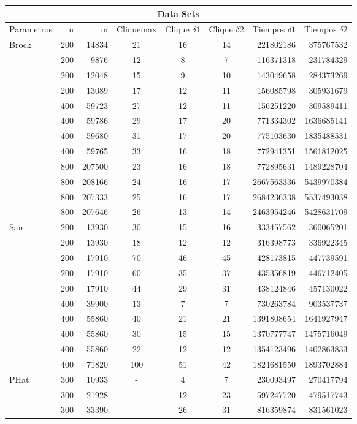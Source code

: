 \begin{tabular}{|l|r|r|c|c|c|r|r|} 
\hline \multicolumn{8}{|c|}{Data Sets} \\
\hline
Parametros & n & m & Cliquemax & Clique $\delta1$ & Clique $\delta2$ & Tiempos $\delta1$ & Tiempos $\delta2$\\ 
\hline \multirow{12}{*}{Brock} 
& 200 & 14834 & 21& 16& 14 &221802186& 375767532\\
& 200 & 9876& 12& 8& 7&116371318& 231784329\\
& 200& 12048& 15& 9& 10&143049658& 284373269\\
& 200& 13089& 17& 12& 11&156085798& 305931679\\
& 400& 59723& 27& 12& 11&156251220& 309589411\\
& 400& 59786& 29& 17& 20&771334302& 1636685141\\
& 400& 59680& 31& 17& 20&775103630&  1835488531\\
& 400& 59765& 33& 16& 18&772941351& 1561812025\\
& 800& 207500& 23& 16& 18&772895631& 1489228704\\
& 800& 208166& 24& 16& 17&2667563336&  5439970384\\
& 800& 207333& 25& 16& 17&2684236338& 5537493038\\
& 800& 207646& 26& 13& 14&2463954246& 5428631709\\
\hline \multirow{10}{*}{San} 
& 200 & 13930& 30& 15& 16&333457562& 360065201\\
& 200& 13930& 18& 12& 12&316398773& 336922345 \\
& 200& 17910& 70& 46& 45&428173815& 447739591\\
& 200 & 17910& 60& 35& 37&435356819& 446712405 \\
& 200& 17910& 44& 29& 31&438124846&  457130022\\
& 400& 39900& 13& 7& 7&730263784& 903537737\\
& 400& 55860& 40& 21& 21&1391808654& 1641927947\\
& 400& 55860& 30& 15& 15&1370777747& 1475716049\\
& 400& 55860& 22& 12& 12&1354123496& 1402863833\\
& 400& 71820& 100& 51& 42&1824681550& 1893702884\\
\hline \multirow{10}{*}{PHat} 	
& 300& 10933& -& 4&	7&230093497 & 270417794\\
& 300& 21928& -& 12& 23&597247720 & 479517743\\
& 300& 33390& -& 26& 31&816359874 & 831561023 \\

\end{tabular}

